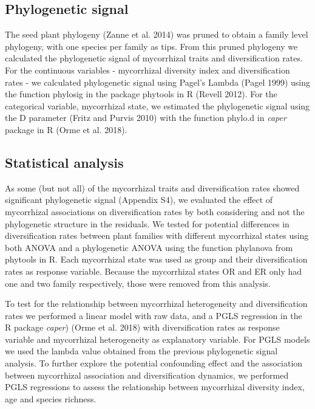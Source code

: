 \documentclass[12pt,]{article}
\begin{document}
\hypertarget{phylogenetic-signal}{%
\subsection{Phylogenetic signal}\label{phylogenetic-signal}}

The seed plant phylogeny (Zanne et al. 2014) was pruned to obtain a
family level phylogeny, with one species per family as tips. From this
pruned phylogeny we calculated the phylogenetic signal of mycorrhizal
traits and diversification rates. For the continuous variables -
mycorrhizal diversity index and diversification rates - we calculated
phylogenetic signal using Pagel's Lambda (Pagel 1999) using the function
phylosig in the package phytools in R (Revell 2012). For the categorical
variable, mycorrhizal state, we estimated the phylogenetic signal using
the D parameter (Fritz and Purvis 2010) with the function phylo.d in
\emph{caper} package in R (Orme et al. 2018).

\hypertarget{statistical-analysis}{%
\subsection{Statistical analysis}\label{statistical-analysis}}

As some (but not all) of the mycorrhizal traits and diversification
rates showed significant phylogenetic signal (Appendix S4), we evaluated
the effect of mycorrhizal associations on diversification rates by both
considering and not the phylogenetic structure in the residuals. We
tested for potential differences in diversification rates between plant
families with different mycorrhizal states using both ANOVA and a
phylogenetic ANOVA using the function phylanova from phytools in R. Each
mycorrhizal state was used as group and their diversification rates as
response variable. Because the mycorrhizal states OR and ER only had one
and two family respectively, those were removed from this analysis.

To test for the relationship between mycorrhizal heterogeneity and
diversification rates we performed a linear model with raw data, and a
PGLS regression in the R package \emph{caper}) (Orme et al. 2018) with
diversification rates as response variable and mycorrhizal heterogeneity
as explanatory variable. For PGLS models we used the lambda value
obtained from the previous phylogenetic signal analysis. To further
explore the potential confounding effect and the association between
mycorrhizal association and diversification dynamics, we performed PGLS
regressions to assess the relationship between mycorrhizal diversity
index, age and species richness.
\end{document}
